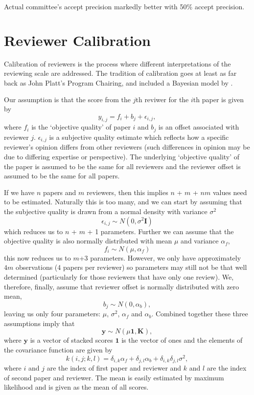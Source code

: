 Actual committee's accept precision markedly better with 50\% accept
precision.

\section{Reviewer Calibration}
\label{app:reviewer-calibration}

Calibration of reviewers is the process where different interpretations
of the reviewing scale are addressed. The tradition of calibration goes
at least as far back as John Platt's Program Chairing, and included a
Bayesian model by \cite{Ge-bayesian15}.

Our assumption is
that the score from the \(j\)th reviwer for the \(i\)th paper is given
by \[
y_{i,j} = f_i + b_j + \epsilon_{i, j},
\] 
where \(f_i\) is the `objective quality' of paper \(i\) and \(b_j\)
is an offset associated with reviewer \(j\). \(\epsilon_{i,j}\) is a
subjective quality estimate which reflects how a specific reviewer's
opinion differs from other reviewers (such differences in opinion may be
due to differing expertise or perspective). The underlying `objective
quality' of the paper is assumed to be the same for all reviewers and
the reviewer offset is assumed to be the same for all papers.

If we have \(n\) papers and \(m\) reviewers, then this implies \(n\) +
\(m\) + \(nm\) values need to be estimated. Naturally this is too many,
and we can start by assuming that the subjective quality is drawn from a
normal density with variance \(\sigma^2\) \[
\epsilon_{i, j} \sim N(0, \sigma^2 \mathbf{I})
\] which reduces us to \(n\) + \(m\) + 1 parameters. Further we can
assume that the objective quality is also normally distributed with mean
\(\mu\) and variance \(\alpha_f\), 
\[
f_i \sim N(\mu, \alpha_f)
\]
this now reduces us to \(m\)+3 parameters. However, we only have
approximately \(4m\) observations (4 papers per reviewer) so parameters
may still not be that well determined (particularly for those reviewers
that have only one review). We, therefore, finally, assume that reviewer
offset is normally distributed with zero mean, \[
b_j \sim N(0, \alpha_b),
\] leaving us only four parameters: \(\mu\), \(\sigma^2\), \(\alpha_f\)
and \(\alpha_b\). Combined together these three assumptions imply that
\[
\mathbf{y} \sim N(\mu \mathbf{1}, \mathbf{K}),
\]
where \(\mathbf{y}\) is a vector of stacked scores \(\mathbf{1}\) is
the vector of ones and the elements of the covariance function are given
by 
\[
k(i,j; k,l) = \delta_{i,k} \alpha_f + \delta_{j,l} \alpha_b + \delta_{i, k}\delta_{j,l} \sigma^2,
\] 
where \(i\) and \(j\) are the index of first paper and reviewer and
\(k\) and \(l\) are the index of second paper and reviewer. The mean is
easily estimated by maximum likelihood and is given as the mean of all
scores.

